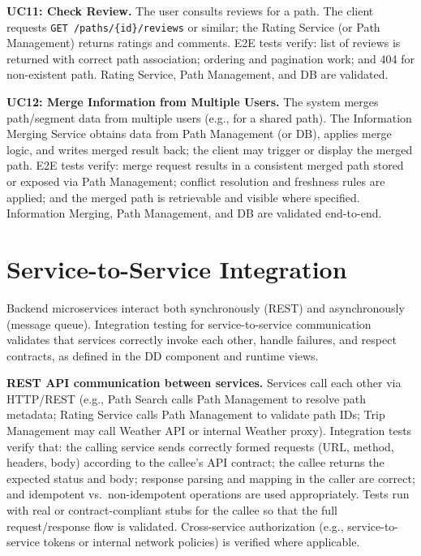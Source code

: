\textbf{UC11: Check Review.}
The user consults reviews for a path. The client requests \texttt{GET /paths/\{id\}/reviews} or similar; the Rating Service (or Path Management) returns ratings and comments. E2E tests verify: list of reviews is returned with correct path association; ordering and pagination work; and 404 for non-existent path. Rating Service, Path Management, and DB are validated.

\textbf{UC12: Merge Information from Multiple Users.}
The system merges path/segment data from multiple users (e.g., for a shared path). The Information Merging Service obtains data from Path Management (or DB), applies merge logic, and writes merged result back; the client may trigger or display the merged path. E2E tests verify: merge request results in a consistent merged path stored or exposed via Path Management; conflict resolution and freshness rules are applied; and the merged path is retrievable and visible where specified. Information Merging, Path Management, and DB are validated end-to-end.

\section{Service-to-Service Integration}
\label{sec:service_to_service_integration}%

Backend microservices interact both synchronously (REST) and asynchronously (message queue). Integration testing for service-to-service communication validates that services correctly invoke each other, handle failures, and respect contracts, as defined in the DD component and runtime views.

\textbf{REST API communication between services.}
Services call each other via HTTP/REST (e.g., Path Search calls Path Management to resolve path metadata; Rating Service calls Path Management to validate path IDs; Trip Management may call Weather API or internal Weather proxy). Integration tests verify that: the calling service sends correctly formed requests (URL, method, headers, body) according to the callee's API contract; the callee returns the expected status and body; response parsing and mapping in the caller are correct; and idempotent vs.\ non-idempotent operations are used appropriately. Tests run with real or contract-compliant stubs for the callee so that the full request/response flow is validated. Cross-service authorization (e.g., service-to-service tokens or internal network policies) is verified where applicable.

